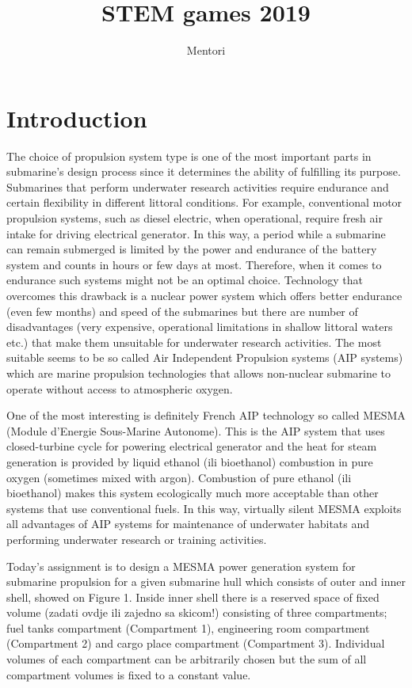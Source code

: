 \documentclass{article}
\title{STEM games 2019}
\author{Mentori}
\begin{document}
	
	\maketitle
		
	\section{Introduction}
	
	The choice of propulsion system type is one of the most important parts in submarine’s design process since it determines the ability of fulfilling its purpose. Submarines that perform underwater research activities require endurance and certain flexibility in different littoral conditions. For example, conventional motor propulsion systems, such as diesel electric, when operational, require fresh air intake for driving electrical generator. In this way, a period while a submarine can remain submerged is limited by the power and endurance of the battery system and counts in hours or few days at most. Therefore, when it comes to endurance such systems might not be an optimal choice. Technology that overcomes this drawback is a nuclear power system which offers better endurance (even few months) and speed of the submarines but there are number of disadvantages (very expensive, operational limitations in shallow littoral waters etc.) that make them unsuitable for underwater research activities. The most suitable seems to be so called Air Independent Propulsion systems (AIP systems) which are marine propulsion technologies that allows non-nuclear submarine to operate without access to atmospheric oxygen. 
	
	One of the most interesting is definitely French AIP technology so called MESMA (Module d'Energie Sous-Marine Autonome). This is the AIP system that uses closed-turbine cycle for powering electrical generator and the heat for steam generation is provided by liquid ethanol (ili bioethanol) combustion in pure oxygen (sometimes mixed with argon). Combustion of pure ethanol (ili bioethanol) makes this system ecologically much more acceptable than other systems that use conventional fuels. In this way, virtually silent MESMA exploits all advantages of AIP systems for maintenance of underwater habitats and performing underwater research or training activities.
	 
	Today's assignment is to design a MESMA power generation system for submarine propulsion for a given submarine hull which consists of outer and inner shell, showed on Figure 1. Inside inner shell there is a reserved space of fixed volume (zadati ovdje ili zajedno sa skicom!) consisting of three compartments; fuel tanks compartment (Compartment 1), engineering room compartment (Compartment 2) and cargo place compartment (Compartment 3). Individual volumes of each compartment can be arbitrarily chosen but the sum of all compartment volumes is fixed to a constant value. 
	
\end{document}
